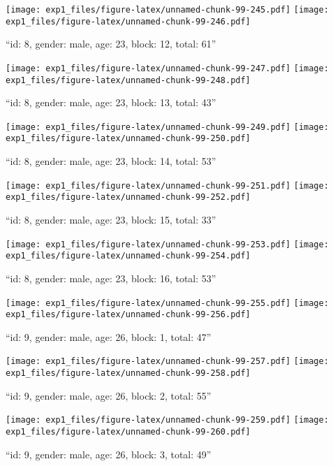 \documentclass[,]{article}
\begin{document}
\texttt{[image: exp1\_files/figure-latex/unnamed-chunk-99-245.pdf]}
\texttt{[image: exp1\_files/figure-latex/unnamed-chunk-99-246.pdf]}

\newpage
[1] 

``id: 8, gender: male, age: 23, block: 12, total: 61''

\texttt{[image: exp1\_files/figure-latex/unnamed-chunk-99-247.pdf]}
\texttt{[image: exp1\_files/figure-latex/unnamed-chunk-99-248.pdf]}

\newpage
[1] 

``id: 8, gender: male, age: 23, block: 13, total: 43''

\texttt{[image: exp1\_files/figure-latex/unnamed-chunk-99-249.pdf]}
\texttt{[image: exp1\_files/figure-latex/unnamed-chunk-99-250.pdf]}

\newpage
[1] 

``id: 8, gender: male, age: 23, block: 14, total: 53''

\texttt{[image: exp1\_files/figure-latex/unnamed-chunk-99-251.pdf]}
\texttt{[image: exp1\_files/figure-latex/unnamed-chunk-99-252.pdf]}

\newpage
[1] 

``id: 8, gender: male, age: 23, block: 15, total: 33''

\texttt{[image: exp1\_files/figure-latex/unnamed-chunk-99-253.pdf]}
\texttt{[image: exp1\_files/figure-latex/unnamed-chunk-99-254.pdf]}

\newpage
[1] 

``id: 8, gender: male, age: 23, block: 16, total: 53''

\texttt{[image: exp1\_files/figure-latex/unnamed-chunk-99-255.pdf]}
\texttt{[image: exp1\_files/figure-latex/unnamed-chunk-99-256.pdf]}

\newpage
[1] 

``id: 9, gender: male, age: 26, block: 1, total: 47''

\texttt{[image: exp1\_files/figure-latex/unnamed-chunk-99-257.pdf]}
\texttt{[image: exp1\_files/figure-latex/unnamed-chunk-99-258.pdf]}

\newpage
[1] 

``id: 9, gender: male, age: 26, block: 2, total: 55''

\texttt{[image: exp1\_files/figure-latex/unnamed-chunk-99-259.pdf]}
\texttt{[image: exp1\_files/figure-latex/unnamed-chunk-99-260.pdf]}

\newpage
[1] 

``id: 9, gender: male, age: 26, block: 3, total: 49''
\end{document}
